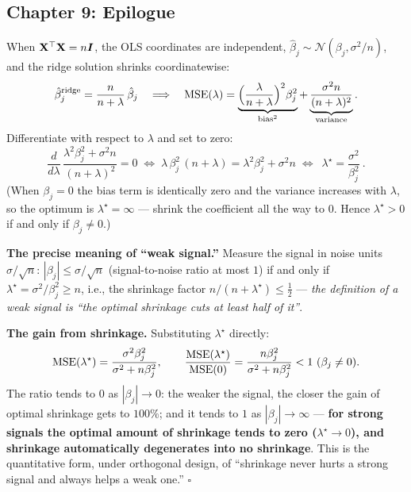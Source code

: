 \subsection{Chapter 9: Epilogue}

\begin{description}[style=nextline, itemsep=1.2ex]
\item[Exercise \ref{ex:orth-ridge} (optimal shrinkage under an orthogonal design)]
When $\mathbf{X}^\top\mathbf{X} = n\bm{I}$, the OLS coordinates are independent, $\hat\beta_j \sim \mathcal{N}(\beta_j, \sigma^2/n)$, and the ridge solution shrinks coordinatewise:
\[
  \hat\beta_j^{\mathrm{ridge}} = \frac{n}{n+\lambda}\,\hat\beta_j
  \quad\Longrightarrow\quad
  \mathrm{MSE}(\lambda) = \underbrace{\Big(\frac{\lambda}{n+\lambda}\Big)^2 \beta_j^2}_{\text{bias}^2} + \underbrace{\frac{\sigma^2 n}{(n+\lambda)^2}}_{\text{variance}} .
\]
Differentiate with respect to $\lambda$ and set to zero:
\[
  \frac{d}{d\lambda}\,\frac{\lambda^2\beta_j^2 + \sigma^2 n}{(n+\lambda)^2} = 0
  \;\Longleftrightarrow\;
  \lambda\,\beta_j^2\,(n+\lambda) = \lambda^2\beta_j^2 + \sigma^2 n
  \;\Longleftrightarrow\;
  \boxed{\ \lambda^\star = \frac{\sigma^2}{\beta_j^2}\ } .
\]
(When $\beta_j = 0$ the bias term is identically zero and the variance increases with $\lambda$, so the optimum is $\lambda^\star = \infty$ --- shrink the coefficient all the way to $0$. Hence $\lambda^\star > 0$ if and only if $\beta_j \neq 0$.)

\textbf{The precise meaning of ``weak signal.''} Measure the signal in noise units $\sigma/\sqrt{n}$: $|\beta_j| \le \sigma/\sqrt{n}$ (signal-to-noise ratio at most $1$) if and only if $\lambda^\star = \sigma^2/\beta_j^2 \ge n$, i.e., the shrinkage factor $n/(n+\lambda^\star) \le \tfrac12$ --- \textit{the definition of a weak signal is ``the optimal shrinkage cuts at least half of it''}.

\textbf{The gain from shrinkage.} Substituting $\lambda^\star$ directly:
\[
  \mathrm{MSE}(\lambda^\star) = \frac{\sigma^2\beta_j^2}{\sigma^2 + n\beta_j^2}, \qquad
  \frac{\mathrm{MSE}(\lambda^\star)}{\mathrm{MSE}(0)} = \frac{n\beta_j^2}{\sigma^2 + n\beta_j^2} < 1 \ (\beta_j \neq 0).
\]
The ratio tends to $0$ as $|\beta_j| \to 0$: the weaker the signal, the closer the gain of optimal shrinkage gets to $100\%$; and it tends to $1$ as $|\beta_j| \to \infty$ --- \textbf{for strong signals the optimal amount of shrinkage tends to zero ($\lambda^\star \to 0$), and shrinkage automatically degenerates into no shrinkage}. This is the quantitative form, under orthogonal design, of ``shrinkage never hurts a strong signal and always helps a weak one.'' $\square$
\end{description}
